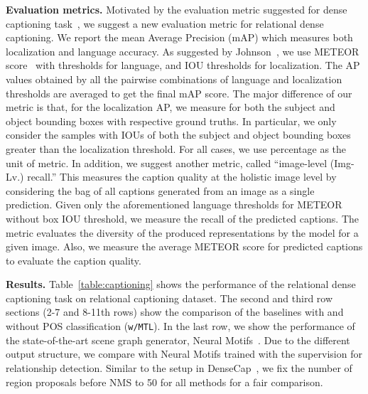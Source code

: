 \documentclass[10pt,twocolumn,letterpaper]{article}
\begin{document}
\noindent\textbf{Evaluation metrics.}
Motivated by the evaluation metric suggested for dense captioning task~\cite{johnson2016densecap},
we suggest a new evaluation metric for relational dense captioning.
We report the mean Average Precision (mAP) which measures both localization and language accuracy. 
As suggested by Johnson~\etal, we use METEOR score~\cite{denkowski2014meteor} with thresholds  for language, and IOU thresholds  for localization.
The AP values obtained by all the pairwise combinations of language and localization thresholds are averaged to get the final mAP score.
The major difference of our metric is that, for the localization AP, we measure for both the subject and object bounding boxes with respective ground truths. 
{In particular, we only consider the samples with IOUs of both the subject and object bounding boxes greater than the localization threshold.}
For all cases, we use percentage as the unit of metric.
In addition, we suggest another metric, called ``image-level (Img-Lv.) recall.'' 
This measures the caption quality at the holistic image level by considering the bag of all captions generated from an image as a single prediction.
Given {only} the aforementioned language thresholds for METEOR {\ie without box IOU threshold}, we measure the recall of the predicted captions.
The metric evaluates the diversity of the produced representations by the model for a given image.
Also, we measure the average METEOR score for predicted captions to evaluate the caption quality.



\noindent\textbf{Results.}
Table~\ref{table:captioning} shows the performance of the relational dense captioning task on relational captioning dataset. 
{The second and third row sections (2-7 and 8-11th rows) show the comparison of the baselines with and without POS classification (\texttt{w/MTL})}.
{In the last row, we show the performance of the state-of-the-art scene graph generator, Neural Motifs~\cite{zellers2018neural}.
Due to the different output structure, we compare with Neural Motifs trained with the supervision for relationship detection.}
Similar to the setup in DenseCap~\cite{johnson2016densecap}, we fix the number of region proposals before NMS to 50 for all methods for a fair comparison.
\end{document}
